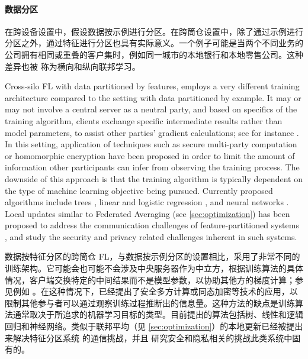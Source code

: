 \paragraph{数据分区} 在跨设备设置中，假设数据按示例进行分区。在跨筒仓设置中，除了通过示例进行分区之外，通过特征进行分区也具有实际意义。一个例子可能是当两个不同业务的公司拥有相同或重叠的客户集时，例如同一城市的本地银行和本地零售公司。这种差异也被 \citet{DBLP:journals/corr/abs-1902-04885} 称为横向和纵向联邦学习。

Cross-silo FL with data partitioned by features, employs a very different training architecture compared to the setting with data partitioned by example. It may or may not involve a central server as a neutral party, and based on specifics of the training algorithm, clients exchange specific intermediate results rather than model parameters, to assist other parties' gradient calculations; see for instance \citep[Section 2.4.2]{DBLP:journals/corr/abs-1902-04885}. In this setting, application of techniques such as secure multi-party computation or homomorphic encryption have been proposed in order to limit the amount of information other participants can infer from observing the training process. The downside of this approach is that the training algorithm is typically dependent on the type of machine learning objective being pursued. Currently proposed algorithms include trees \citep{DBLP:journals/corr/abs-1901-08755}, linear and logistic regression \citep{DBLP:journals/corr/abs-1902-04885,Hardy2017-da,liuVFL}, and neural networks \citep{liu2018secure}. Local updates similar to Federated Averaging (see \cref{sec:optimization}) has been proposed to address the communication challenges of feature-partitioned systems \citep{liuVFL}, and \citep{hu2019learning, liu2020backdoor} study the security and privacy related challenges inherent in such systems.

数据按特征分区的跨筒仓 FL，与数据按示例分区的设置相比，采用了非常不同的训练架构。它可能会也可能不会涉及中央服务器作为中立方，根据训练算法的具体情况，客户端交换特定的中间结果而不是模型参数，以协助其他方的梯度计算；参见例如 \citep[Section 2.4.2]{DBLP:journals/corr/abs-1902-04885}。在这种情况下，已经提出了安全多方计算或同态加密等技术的应用，以限制其他参与者可以通过观察训练过程推断出的信息量。这种方法的缺点是训练算法通常取决于所追求的机器学习目标的类型。目前提出的算法包括树\citep{DBLP:journals/corr/abs-1901-08755}、线性和逻辑回归\citep{DBLP:journals/corr/abs-1902-04885,Hardy2017-da,liuVFL}和神经网络\citep{liu2018secure}。类似于联邦平均（见 \cref{sec:optimization}）的本地更新已经被提出来解决特征分区系统 \citep{liuVFL} 的通信挑战，并且 \citep{hu2019learning, liu2020backdoor} 研究安全和隐私相关的挑战此类系统中固有的。

